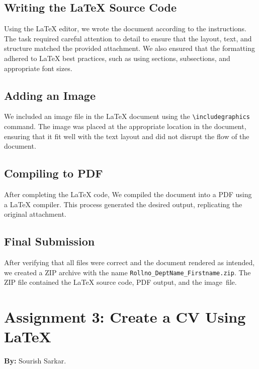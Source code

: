 \documentclass[a4paper,12pt]{article}
\begin{document}
\subsection{Writing the LaTeX Source Code}

Using the LaTeX editor, we wrote the document according to the instructions. The task required careful attention to detail to ensure that the layout, text, and structure matched the provided attachment. We also ensured that the formatting adhered to LaTeX best practices, such as using sections, subsections, and appropriate font sizes.

\subsection{Adding an Image}

We included an image file in the LaTeX document using the \texttt{\textbackslash includegraphics} command. The image was placed at the appropriate location in the document, ensuring that it fit well with the text layout and did not disrupt the flow of the document.

\subsection{Compiling to PDF}

After completing the LaTeX code, We compiled the document into a PDF using a LaTeX compiler. This process generated the desired output, replicating the original attachment.



\subsection{Final Submission}

After verifying that all files were correct and the document rendered as intended, we created a ZIP archive with the name \texttt{Rollno\_DeptName\_Firstname.zip}. The ZIP file contained the LaTeX source code, PDF output, and the image file.

\newpage


\section{Assignment 3: Create a CV Using LaTeX}

\textbf{By:} Sourish Sarkar.
\end{document}
